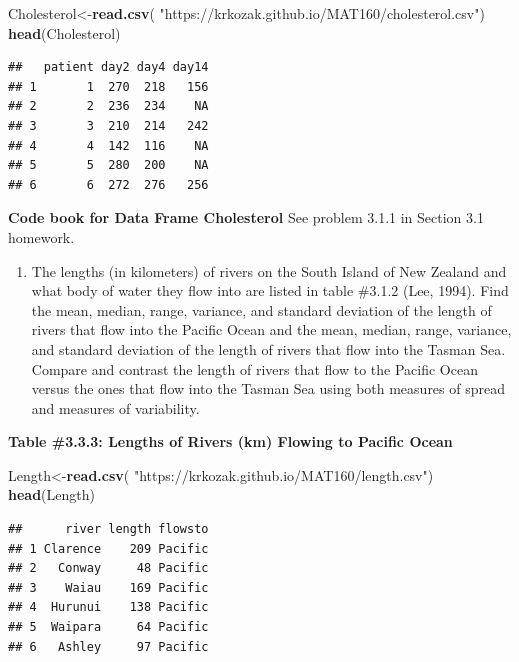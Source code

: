 \documentclass[
]{book}
\newenvironment{Shaded}{\begin{snugshade}}{\end{snugshade}}
\newcommand{\KeywordTok}[1]{\textcolor[rgb]{0.13,0.29,0.53}{\textbf{#1}}}
\newcommand{\NormalTok}[1]{#1}
\newcommand{\StringTok}[1]{\textcolor[rgb]{0.31,0.60,0.02}{#1}}
\providecommand{\tightlist}{%
  \setlength{\itemsep}{0pt}\setlength{\parskip}{0pt}}
\begin{document}
\begin{Shaded}
\begin{Highlighting}[]
\NormalTok{Cholesterol<-}\KeywordTok{read.csv}\NormalTok{(}
  \StringTok{"https://krkozak.github.io/MAT160/cholesterol.csv"}\NormalTok{)}
\KeywordTok{head}\NormalTok{(Cholesterol)}
\end{Highlighting}
\end{Shaded}

\begin{verbatim}
##   patient day2 day4 day14
## 1       1  270  218   156
## 2       2  236  234    NA
## 3       3  210  214   242
## 4       4  142  116    NA
## 5       5  280  200    NA
## 6       6  272  276   256
\end{verbatim}

\textbf{Code book for Data Frame Cholesterol} See problem 3.1.1 in Section 3.1 homework.

\begin{enumerate}
\def\labelenumi{\arabic{enumi}.}
\setcounter{enumi}{1}
\tightlist
\item
  The lengths (in kilometers) of rivers on the South Island of New Zealand and what body of water they flow into are listed in table \#3.1.2 (Lee, 1994). Find the mean, median, range, variance, and standard deviation of the length of rivers that flow into the Pacific Ocean and the mean, median, range, variance, and standard deviation of the length of rivers that flow into the Tasman Sea. Compare and contrast the length of rivers that flow to the Pacific Ocean versus the ones that flow into the Tasman Sea using both measures of spread and measures of variability.
\end{enumerate}

\textbf{Table \#3.3.3: Lengths of Rivers (km) Flowing to Pacific Ocean}

\begin{Shaded}
\begin{Highlighting}[]
\NormalTok{Length<-}\KeywordTok{read.csv}\NormalTok{(}
  \StringTok{"https://krkozak.github.io/MAT160/length.csv"}\NormalTok{)}
\KeywordTok{head}\NormalTok{(Length)}
\end{Highlighting}
\end{Shaded}

\begin{verbatim}
##      river length flowsto
## 1 Clarence    209 Pacific
## 2   Conway     48 Pacific
## 3    Waiau    169 Pacific
## 4  Hurunui    138 Pacific
## 5  Waipara     64 Pacific
## 6   Ashley     97 Pacific
\end{verbatim}
\end{document}
